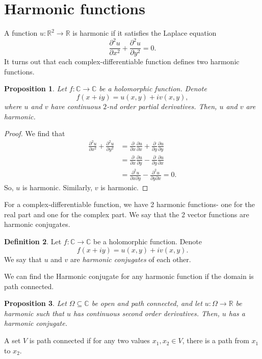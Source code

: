 \documentclass[a4paper, openany]{memoir}
\theoremstyle{definition}
\newtheorem{definition}{Definition}[section]
\theoremstyle{plain}
\newtheorem{proposition}[definition]{Proposition}
\begin{document}
\section{Harmonic functions}
A function $u: \mathbb{R}^2 \to \mathbb{R}$ is harmonic if it satisfies the Laplace equation
\[\frac{\partial^2 u}{\partial x^2} + \frac{\partial^2 u}{\partial y^2} = 0.\]
It turns out that each complex-differentiable function defines two harmonic functions.
\begin{proposition}
Let $f: \mathbb{C} \to \mathbb{C}$ be a holomorphic function. Denote
\[f(x + iy) = u(x, y) + iv(x, y),\]
where $u$ and $v$ have continuous $2$-nd order partial derivatives. Then, $u$ and $v$ are harmonic.
\end{proposition}
\begin{proof}
We find that
\begin{align*}
    \frac{\partial^2 u}{\partial x^2} + \frac{\partial^2 u}{\partial y^2} &= \frac{\partial}{\partial x} \frac{\partial u}{\partial x} + \frac{\partial}{\partial y} \frac{\partial u}{\partial y} \\
    &= \frac{\partial}{\partial x} \frac{\partial u}{\partial y} - \frac{\partial}{\partial y} \frac{\partial u}{\partial x} \\
    &= \frac{\partial^2 u}{\partial x \partial y} - \frac{\partial^2 u}{\partial y \partial x} = 0.
\end{align*}
So, $u$ is harmonic. Similarly, $v$ is harmonic.
\end{proof}

For a complex-differentiable function, we have 2 harmonic functions- one for the real part and one for the complex part. We say that the 2 vector functions are harmonic conjugates.
\begin{definition}
Let $f: \mathbb{C} \to \mathbb{C}$ be a holomorphic function. Denote
\[f(x + iy) = u(x, y) + iv(x, y).\]
We say that $u$ and $v$ are \emph{harmonic conjugates} of each other.
\end{definition}
\noindent We can find the Harmonic conjugate for any harmonic function if the domain is path connected.
\begin{proposition}
Let $\Omega \subseteq \mathbb{C}$ be open and path connected, and let $u: \Omega \to \mathbb{R}$ be harmonic such that $u$ has continuous second order derivatives. Then, $u$ has a harmonic conjugate.
\end{proposition}
\noindent A set $V$ is path connected if for any two values $x_1, x_2 \in V$, there is a path from $x_1$ to $x_2$.
\end{document}
